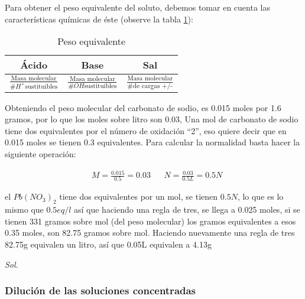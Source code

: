 Para obtener el peso equivalente del soluto, debemos tomar en cuenta las características químicas de éste (observe la tabla \ref{tabq3}):

\begin{table}[h!]
	\centering
	\begin{tabular}{|c|c|c|}
		\hline
		Ácido                                                       & Base                                                     & Sal                                                     \\ \hline
		$\frac{\text{Masa molecular}}{\#H^{+} \text{sustituibles}}$ & $\frac{\text{Masa molecular}}{\#OH \text{sustituibles}}$ & $\frac{\text{Masa molecular}}{\text{\# de cargas +/-}}$ \\ \hline
	\end{tabular}
	\caption{Peso equivalente}
	\label{tabq3}
\end{table}

\begin{problem}

Obteniendo el peso molecular del carbonato de sodio, es 0.015 moles por 1.6 gramos, por lo que los moles sobre litro son 0.03,
Una mol de carbonato de sodio tiene dos equivalentes por el número de oxidación ``2'', eso quiere decir que en 0.015 moles se tienen 0.3 equivalentes. Para calcular la normalidad basta hacer la siguiente operación:

\begin{align*}
	 & M=\frac{0.015}{0.5}=0.03 &  & N=\frac{0{.}03}{0{.}5L}=0{.}5N
\end{align*}
\end{problem}

\begin{problem}

el $Pb(NO_{3})_{2}$ tiene dos equivalentes por un mol, se tienen $0{.}5N$, lo que es lo mismo que $0{.}5 eq/l$
así que haciendo una regla de tres, se llega a 0.025 moles, si se tienen 331 gramos sobre mol (del peso molecular)
los gramos equivalentes a esos 0.35 moles, son 82.75 gramos sobre mol. Haciendo nuevamente una regla de tres
82.75g equivalen un litro, así que 0.05L equivalen a 4.13g
\end{problem}

\textit{ Sol. }

\subsubsection{Dilución de las soluciones concentradas}

